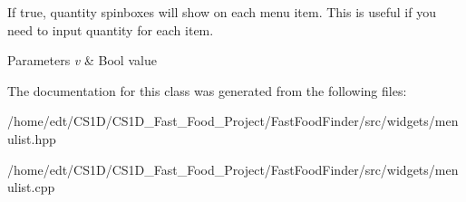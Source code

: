 If true, quantity spinboxes will show on each menu item. This is useful if you need to input quantity for each item.


\begin{DoxyParams}{Parameters}
{\em v} & Bool value \\
\hline
\end{DoxyParams}


The documentation for this class was generated from the following files\-:\begin{DoxyCompactItemize}
\item 
/home/edt/\-C\-S1\-D/\-C\-S1\-D\-\_\-\-Fast\-\_\-\-Food\-\_\-\-Project/\-Fast\-Food\-Finder/src/widgets/menulist.\-hpp\item 
/home/edt/\-C\-S1\-D/\-C\-S1\-D\-\_\-\-Fast\-\_\-\-Food\-\_\-\-Project/\-Fast\-Food\-Finder/src/widgets/menulist.\-cpp\end{DoxyCompactItemize}
